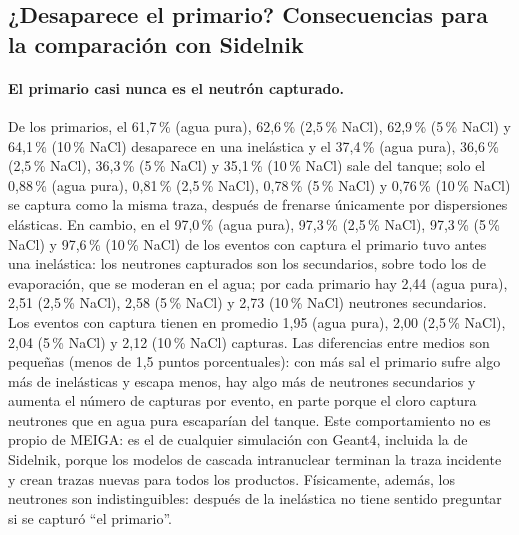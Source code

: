 \documentclass[11pt,a4paper]{article}
\begin{document}
\subsection{¿Desaparece el primario? Consecuencias para la comparación con Sidelnik}\label{sec:primario_captura}
\paragraph{El primario casi nunca es el neutrón capturado.} De los primarios, el 61,7\,\% (agua pura), 62,6\,\% (2,5\,\% NaCl), 62,9\,\% (5\,\% NaCl) y 64,1\,\% (10\,\% NaCl) desaparece en una inelástica y el 37,4\,\% (agua pura), 36,6\,\% (2,5\,\% NaCl), 36,3\,\% (5\,\% NaCl) y 35,1\,\% (10\,\% NaCl) sale del tanque;
solo el 0,88\,\% (agua pura), 0,81\,\% (2,5\,\% NaCl), 0,78\,\% (5\,\% NaCl) y 0,76\,\% (10\,\% NaCl) se captura como la misma traza, después de frenarse únicamente por dispersiones elásticas.
En cambio, en el 97,0\,\% (agua pura), 97,3\,\% (2,5\,\% NaCl), 97,3\,\% (5\,\% NaCl) y 97,6\,\% (10\,\% NaCl) de los eventos con captura el primario tuvo antes una inelástica: los neutrones capturados son los secundarios, sobre todo los de evaporación, que se moderan en el agua;
por cada primario hay 2,44 (agua pura), 2,51 (2,5\,\% NaCl), 2,58 (5\,\% NaCl) y 2,73 (10\,\% NaCl) neutrones secundarios. Los eventos con captura tienen en promedio 1,95 (agua pura), 2,00 (2,5\,\% NaCl), 2,04 (5\,\% NaCl) y 2,12 (10\,\% NaCl) capturas.
Las diferencias entre medios son pequeñas (menos de 1,5 puntos porcentuales): con más sal el primario sufre algo más de inelásticas y escapa menos, hay algo más de neutrones secundarios y aumenta el número de capturas por evento, en parte porque el cloro captura neutrones que en agua pura escaparían del tanque.
Este comportamiento no es propio de MEIGA: es el de cualquier simulación con Geant4, incluida la de Sidelnik, porque los modelos de cascada intranuclear terminan la traza incidente y crean trazas nuevas para todos los productos.
Físicamente, además, los neutrones son indistinguibles: después de la inelástica no tiene sentido preguntar si se capturó ``el primario''.
\end{document}
